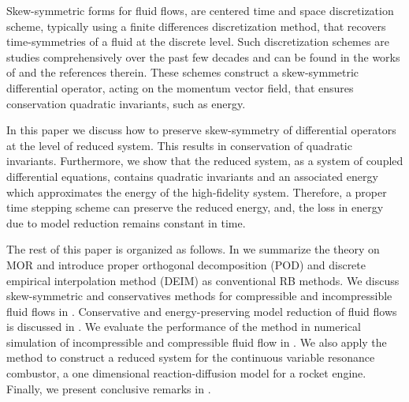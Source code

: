 Skew-symmetric forms for fluid flows, are centered time and space discretization scheme, typically using a finite differences discretization method, that recovers time-symmetries of a fluid at the discrete level. Such discretization schemes are studies comprehensively over the past few decades and can be found in the works of \cite{morinishi2010skew,morinishi1998fully,desjardins2008high,reiss2014conservative,reiss2014conservative} and the references therein. These schemes construct a skew-symmetric differential operator, acting on the momentum vector field, that ensures conservation quadratic invariants, such as energy.  

In this paper we discuss how to preserve skew-symmetry of differential operators at the level of reduced system. This results in conservation of quadratic invariants. Furthermore, we show that the reduced system, as a system of coupled differential equations, contains quadratic invariants and an associated energy which approximates the energy of the high-fidelity system. Therefore, a proper time stepping scheme can preserve the reduced energy, and, the loss in energy due to model reduction remains constant in time.

The rest of this paper is organized as follows. In  we summarize the theory on MOR and introduce proper orthogonal decomposition (POD) and discrete empirical interpolation method (DEIM) as conventional RB methods. We discuss skew-symmetric and conservatives methods for compressible and incompressible fluid flows in . Conservative and energy-preserving model reduction of fluid flows is discussed in . We evaluate the performance of the method in numerical simulation of incompressible and compressible fluid flow in . We also apply the method to construct a reduced system for the continuous variable resonance combustor, a one dimensional reaction-diffusion model for a rocket engine. Finally, we present conclusive remarks in .
